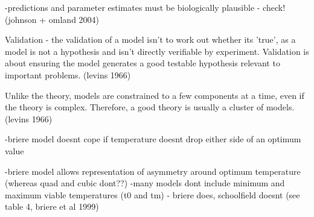 \documentclass[12pt]{article}
\begin{document}
-predictions and parameter estimates must be biologically plausible - check! (johnson + omland 2004)

Validation - the validation of a model isn't to work out whether its 'true', as a model is not a hypothesis and isn't directly verifiable by experiment. Validation is about ensuring the model generates a good testable hypothesis relevant to important problems. (levins 1966)

Unlike the theory, models are constrained to a few components at a time, even if the theory is complex. Therefore, a good theory is usually a cluster of models. (levins 1966)

-briere model doesnt cope if temperature doesnt drop either side of an optimum value

-briere model allows representation of asymmetry around optimum temperature (whereas quad and cubic dont??)
-many models dont include minimum and maximum viable temperatures (t0 and tm) - briere does, schoolfield doesnt (see table 4, briere et al 1999)
\end{document}
